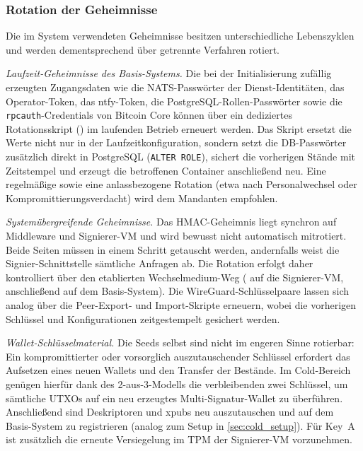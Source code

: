 \subsubsection{Rotation der Geheimnisse}
Die im System verwendeten Geheimnisse besitzen unterschiedliche Lebenszyklen und werden dementsprechend über getrennte Verfahren rotiert.

\emph{Laufzeit-Geheimnisse des Basis-Systems.} Die bei der Initialisierung zufällig erzeugten Zugangsdaten wie die \ac{NATS}-Passwörter der Dienst-Identitäten, das Operator-Token, das ntfy-Token, die PostgreSQL-Rollen-Passwörter sowie die \texttt{rpcauth}-Credentials von Bitcoin Core können über ein dediziertes Rotationsskript () im laufenden Betrieb erneuert werden. Das Skript ersetzt die Werte nicht nur in der Laufzeitkonfiguration,
sondern setzt die \ac{DB}-Passwörter zusätzlich direkt in PostgreSQL (\texttt{ALTER ROLE}), sichert die vorherigen Stände mit Zeitstempel und erzeugt die betroffenen Container anschließend neu. Eine regelmäßige sowie eine anlassbezogene Rotation (etwa nach Personalwechsel oder Kompromittierungsverdacht) wird dem Mandanten empfohlen.

\emph{Systemübergreifende Geheimnisse.} Das \ac{HMAC}-Geheimnis liegt synchron auf Middleware und Signierer-\ac{VM} und wird bewusst nicht automatisch mitrotiert.
Beide Seiten müssen in einem Schritt getauscht werden, andernfalls weist die Signier-Schnittstelle sämtliche Anfragen ab. Die Rotation erfolgt daher kontrolliert über den etablierten Wechselmedium-Weg ( auf die Signierer-\ac{VM}, anschließend  auf dem Basis-System). Die WireGuard-Schlüsselpaare lassen sich analog über die Peer-Export- und Import-Skripte erneuern, wobei die vorherigen Schlüssel und Konfigurationen zeitgestempelt gesichert werden.

\emph{Wallet-Schlüsselmaterial.} Die Seeds selbst sind nicht im engeren Sinne rotierbar: Ein kompromittierter oder vorsorglich auszutauschender Schlüssel erfordert das Aufsetzen eines neuen Wallets und den Transfer der Bestände. Im Cold-Bereich genügen hierfür dank des 2-aus-3-Modells die
verbleibenden zwei Schlüssel, um sämtliche \acp{UTXO} auf ein neu erzeugtes Multi-Signatur-Wallet zu überführen.
Anschließend sind Deskriptoren und \acp{xpub} neu auszutauschen und auf dem Basis-System zu registrieren (analog zum Setup in \ref{sec:cold_setup}). Für Key~A ist zusätzlich die erneute Versiegelung im \ac{TPM} der Signierer-\ac{VM} vorzunehmen.

